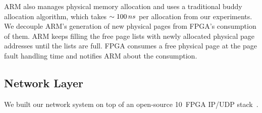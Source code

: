 ARM also manages physical memory allocation and uses a traditional buddy allocation algorithm, which takes $\sim100\mbox{\,$ns$}$ per allocation from our experiments. 
We decouple ARM's generation of 
new physical pages from FPGA's consumption of them.
ARM keeps filling the free page lists
with newly allocated physical page addresses until the lists are full.
FPGA consumes a free physical page at the page fault handling time and 
notifies ARM about the consumption. %

\subsection{Network Layer}
\label{sec:network}

We built our network system on top of an open-source 10\Gbps\ FPGA IP/UDP stack~\cite{Corundum-FCCM20}.

\fi
